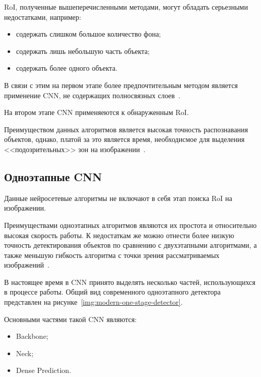 RoI, полученные вышеперечисленными методами, могут обладать серьезными недостатками, например:
\begin{itemize}[label=---]
    \item содержать слишком большое количество фона;
    \item содержать лишь небольшую часть объекта;
    \item содержать более одного объекта.
\end{itemize}

В связи с этим на первом этапе более предпочтительным методом является применение CNN, не содержащих полносвязных слоев~\cite{realtime-recognition-algorythm}.

На втором этапе CNN применяеются к обнаруженным RoI.

Преимуществом данных алгоритмов является высокая точность распознавания объектов, однако, платой за это является время, необходисмое для выделения <<подозрительных>> зон на изображении~\cite{overview-of-two-stage-object-detection}.

\subsection{Одноэтапные CNN}

Данные нейросетевые алгоритмы не включают в себя этап поиска RoI на изображении.


Преимуществами одноэтапных алгоритмов являются их простота и относительно высокая скорость работы. К недостаткам же можно отнести более низкую точность детектирования объектов по сравнению с двухэтапными алгоритмами, а также меньшую гибкость алгоритма с точки зрения рассматриваемых изображений~\cite{review-on-one-stage-object-detection}.

В настоящее время в CNN принято выделять несколько частей, использующихся в процессе работы. Общий вид современного одноэтапного детектора представлен на рисунке~\ref{img:modern-one-stage-detector}.


Основными частями такой CNN являются:
\begin{itemize}[label=---]
    \item Backbone;
    \item Neck;
    \item Dense Prediction.
\end{itemize}

